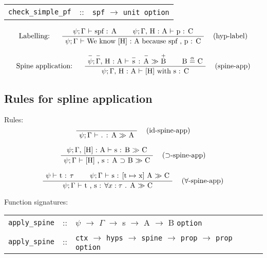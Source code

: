 \documentclass[twoside,a4paper]{article}
\theoremstyle{definition}
\begin{document}
\begin{center}
\begin{tabular}{rll}

{\tt check_simple_pf} &::& {\tt spf} $\rightarrow$ {\tt unit option}

\end{tabular}
\end{center}

\[
\AxiomC{$\psi ; \Gamma $ $\vdash$ spf : A}
\AxiomC{$\psi ; \Gamma ,$ H : A $\vdash$ p : C}
\LeftLabel{Labelling: \quad}
\RightLabel{\quad (hyp-label)}
\BinaryInfC{$\psi ; \Gamma $ $\vdash$ We know [H] : A because spf , p : C}
\DisplayProof
\]

\[
\AxiomC{$\overset{-}\psi ; \overset{-}\Gamma ,$ H : A $\vdash$ $\overset{-}{\text s}$ : $\overset{-}{\text A}$ $\gg$ $\overset{+}{\text B}$}
\AxiomC{B $\overset{\alpha}=$ C}
\LeftLabel{Spine application: \quad}
\RightLabel{\quad (spine-app)}
\BinaryInfC{$\psi ; \Gamma $, H : A $\vdash$ [H] with s : C}
\DisplayProof
\]

\subsection{Rules for spline application}

Rules:
\[
\AxiomC{}
\AxiomC{}
\RightLabel{\quad (id-spine-app)}
\BinaryInfC{$\psi ; \Gamma $ $\vdash$ . : A $\gg$ A}
\DisplayProof
\]

\[
\AxiomC{$\psi ; \Gamma ,$ [H] : A $\vdash$ s : B $\gg$ C}
\RightLabel{\quad ($\supset$-spine-app)}
\UnaryInfC{$\psi ; \Gamma $ $\vdash$ [H] , s : A $\supset$ B $\gg$ C}
\DisplayProof
\]

\[
\AxiomC{$\psi \vdash$ t : $\tau$}
\AxiomC{$\psi ; \Gamma $ $\vdash$ s : [t $\mapsto$ x] A $\gg$ C}
\RightLabel{\quad ($\forall$-spine-app)}
\BinaryInfC{$\psi ; \Gamma $ $\vdash$ t , s : $\forall x :\tau$ . A $\gg$ C}
\DisplayProof
\]

Function signatures:

\begin{center}
\begin{tabular}{rll}

{\tt apply_spine} &::& $\psi$ $\rightarrow$ $\Gamma$ $\rightarrow$ s $\rightarrow$ A $\rightarrow$ B {\tt option}
\\
{\tt apply_spine} &::& {\tt ctx} $\rightarrow$ {\tt hyps} $\rightarrow$ {\tt spine} $\rightarrow$ {\tt prop} $\rightarrow$ {\tt prop option}

\end{tabular}
\end{center}



\end{document}
